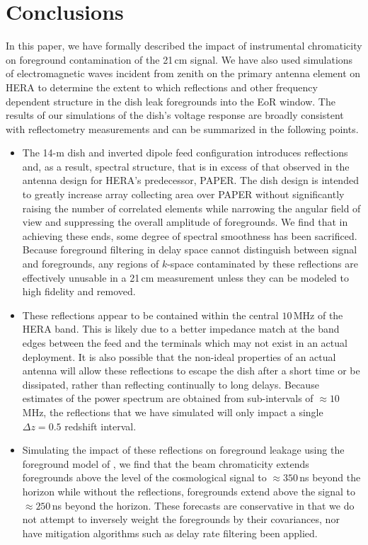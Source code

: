 \documentclass[twocolumn]{emulateapj}
\begin{document}
\section{Conclusions}\label{sec:Conclusion}
In this paper, we have formally described the impact of instrumental chromaticity on foreground contamination of the 21\,cm signal. We have also used simulations of electromagnetic waves incident from zenith on the primary antenna element on HERA to determine the extent to which reflections and other frequency dependent structure in the dish leak foregrounds into the EoR window. The results of our simulations of the dish's voltage response are broadly consistent with reflectometry measurements \citep{Patra:2016} and can be summarized in the following points. 
\begin{itemize}
\item The 14-m dish and inverted dipole feed configuration introduces reflections and, as a result, spectral structure, that is in excess of that observed in the antenna design for HERA's predecessor, PAPER. The dish design is intended to greatly increase array collecting area over PAPER without significantly raising the number of correlated elements while narrowing the angular field of view and suppressing the overall amplitude of foregrounds. We find that in achieving these ends, some degree of spectral smoothness has been sacrificed. Because foreground filtering in delay space cannot distinguish between signal and foregrounds, any regions of $k$-space contaminated by these reflections are effectively unusable in a 21\,cm measurement unless they can be modeled to high fidelity and removed. 

\item These reflections appear to be contained within the central $10$\,MHz of the HERA band. This is likely due to a better impedance match at the band edges between the feed and the terminals which may not exist in an actual deployment. It is also possible that the  non-ideal properties of an actual antenna will allow these reflections to escape the dish after a short time or be dissipated, rather than reflecting continually to long delays. Because estimates of the power spectrum are obtained from sub-intervals of $\approx10$\,MHz, the reflections that we have simulated will only impact a single $\Delta z=0.5$ redshift interval.

\item Simulating the impact of these reflections on foreground leakage using the foreground model of \citet{Thyagarajan:2016}, we find that the beam chromaticity extends foregrounds above the level of the cosmological signal to $\approx 350$\,ns beyond the horizon while without the reflections, foregrounds extend above the signal to $\approx 250$\,ns beyond the horizon. These forecasts are conservative in that we do not attempt to inversely weight the foregrounds by their covariances, nor have mitigation algorithms such as delay rate filtering been applied.


\end{itemize}
\end{document}
